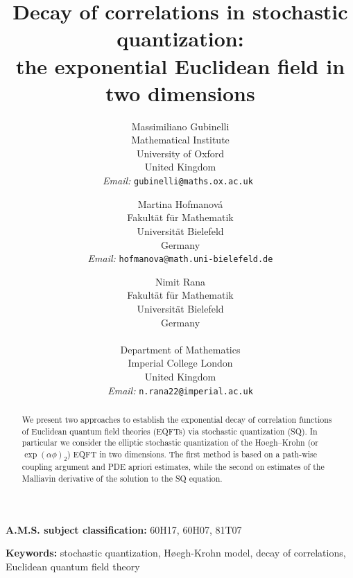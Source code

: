\documentclass{article}
\newcommand{\tmaffiliation}[1]{\\ #1}
\newcommand{\tmemail}[1]{\\ \textit{Email:} \texttt{#1}}
\newcommand{\tmsep}{, }
\newcommand{\tmtextit}[1]{\text{{\itshape{#1}}}}
\newcommand{\tmkeywords}{\textbf{Keywords:} }
\newcommand{\tmmsc}{\textbf{A.M.S. subject classification:} }
\begin{document}
	

\title{
  Decay of correlations in stochastic quantization:\\
  the exponential Euclidean field in two dimensions
}

\author{
  Massimiliano Gubinelli
  \tmaffiliation{Mathematical Institute \\
  University of Oxford \\
  United Kingdom}
  \tmemail{gubinelli@maths.ox.ac.uk
  }
  \and
  Martina Hofmanov{\'a}
  \tmaffiliation{Fakult{\"a}t f{\"u}r Mathematik\\
  Universit{\"a}t Bielefeld \\
  Germany}
  \tmemail{hofmanova@math.uni-bielefeld.de}
  \and
  Nimit Rana
  \tmaffiliation{Fakult{\"a}t f{\"u}r Mathematik\\
  Universit{\"a}t Bielefeld \\
  Germany\\
  \tmtextit{and}\\
  Department of Mathematics\\
  Imperial College London\\
  United Kingdom}
  \tmemail{n.rana22@imperial.ac.uk}
}

\date{}

\maketitle

\begin{abstract}
  We present two approaches to establish the exponential decay of correlation
  functions of Euclidean quantum field theories (EQFTs) via stochastic
  quantization (SQ). In particular we consider the elliptic stochastic
  quantization of the H{\o}egh--Krohn (or $\exp (\alpha \phi)_2$) EQFT in two
  dimensions. The first method is based on a path-wise coupling argument and
  PDE apriori estimates, while the second on estimates of the Malliavin
  derivative of the solution to the SQ equation.
\end{abstract}

\tmmsc{60H17}{\tmsep}{60H07}{\tmsep}{81T07}

\tmkeywords{stochastic quantization}{\tmsep}{H{\o}egh-Krohn
model}{\tmsep}{decay of correlations}{\tmsep}{Euclidean quantum field theory}

{\tableofcontents}
\end{document}
